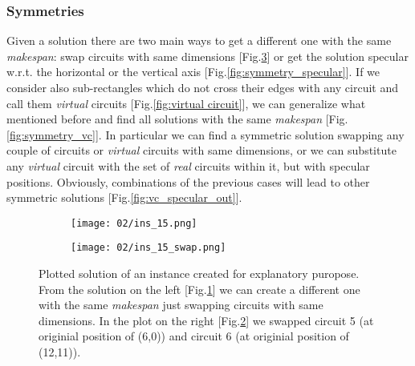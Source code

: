     \subsubsection{Symmetries} \label{sec:symmetries}

        Given a solution there are two main ways to get a different one with the same \textit{makespan}:
        swap circuits with same dimensions [Fig.\ref{fig:symmetry_swap}] or get the solution specular w.r.t. the horizontal 
        or the vertical axis [Fig.\ref{fig:symmetry_specular}].
        If we consider also sub-rectangles which do not cross their edges with any circuit and call them 
        \textit{virtual} circuits [Fig.\ref{fig:virtual circuit}], we can generalize what mentioned before and find all solutions with 
        the same \textit{makespan} [Fig.\ref{fig:symmetry_vc}].
        In particular we can find a symmetric solution swapping any couple of circuits or \textit{virtual} circuits 
        with same dimensions, or we can substitute any \textit{virtual} circuit with the set of \textit{real} circuits within it, 
        but with specular positions. Obviously, combinations of the previous cases will lead to other symmetric 
        solutions [Fig.\ref{fig:vc_specular_out}].

        \begin{figure}[H]
            \centering
            \begin{subfigure}[b]{0.45\textwidth}
                \centering 
                \texttt{[image: 02/ins\_15.png]}
                \caption{}
                \label{fig:ins_15_mod}
            \end{subfigure}
            \hfill
            \begin{subfigure}[b]{0.45\textwidth}
                \centering
                \texttt{[image: 02/ins\_15\_swap.png]}
                \caption{}
                \label{fig:ins_15_swap}
            \end{subfigure}
            \hfill
            \caption{
                Plotted solution of an instance created for explanatory puropose.
                From the solution on the left [Fig.\ref{fig:ins_15_mod}] we can create a different one
                with the same \textit{makespan} just swapping circuits with same dimensions. In
                the plot on the right [Fig.\ref{fig:ins_15_swap}] we swapped circuit 5 (at originial
                position of (6,0)) and circuit 6 (at originial position of (12,11)).
            }
            \label{fig:symmetry_swap}
        \end{figure}
       
